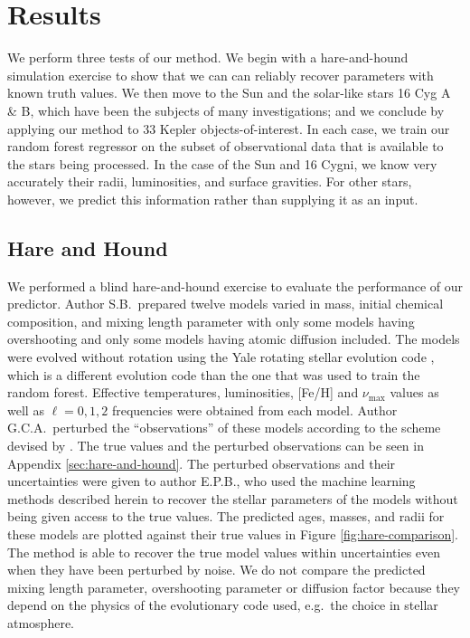 \documentclass[twocolumn,twocolappendix]{aastex6}
\begin{document}


\section{Results}
We perform three tests of our method. We begin with a hare-and-hound simulation exercise to show that we can can reliably recover parameters with known truth values. We then move to the Sun and the solar-like stars 16 Cyg A \& B, which have been the subjects of many investigations; and we conclude by applying our method to 33 Kepler objects-of-interest. In each case, we train our random forest regressor on the subset of observational data that is available to the stars being processed. In the case of the Sun and 16 Cygni, we know very accurately their radii, luminosities, and surface gravities. For other stars, however, we predict this information rather than supplying it as an input. 


\subsection{Hare and Hound} 
We performed a blind hare-and-hound exercise to evaluate the performance of our predictor. Author S.B.\ prepared twelve models varied in mass, initial chemical composition, and mixing length parameter with only some models having overshooting and only some models having atomic diffusion included. The models were evolved without rotation using the Yale rotating stellar evolution code \citep[YREC;][]{2008Ap&SS.316...31D}, which is a different evolution code than the one that was used to train the random forest. Effective temperatures, luminosities, [Fe/H] and $\nu_{\max}$ values as well as $\ell=0,1,2$ frequencies were obtained from each model. Author G.C.A.\  perturbed the ``observations'' of these models according to the scheme devised by \citet{spaceinn}. The true values and the perturbed observations can be seen in Appendix \ref{sec:hare-and-hound}. The perturbed observations and their uncertainties were given to author E.P.B.\@, who used the machine learning methods described herein to recover the stellar parameters of the models without being given access to the true values. The predicted ages, masses, and radii for these models are plotted against their true values in Figure \ref{fig:hare-comparison}. The method is able to recover the true model values within uncertainties even when they have been perturbed by noise. We do not compare the predicted mixing length parameter, overshooting parameter or diffusion factor because they depend on the physics of the evolutionary code used, e.g.\ the choice in stellar atmosphere. 
\end{document}
